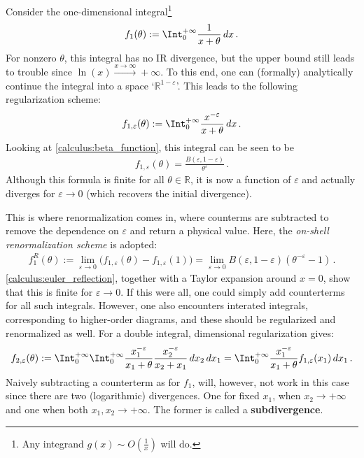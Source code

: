     Consider the one-dimensional integral\footnote{Any integrand $g(x)\sim O(\frac{1}{x})$ will do.}
    \begin{gather}
        f_1(\theta) := \Int_0^{+\infty}\frac{1}{x+\theta}\,dx\,.
    \end{gather}
    For nonzero $\theta$, this integral has no IR divergence, but the upper bound still leads to trouble since $\ln(x)\xrightarrow{x\longrightarrow\infty}+\infty$. To this end, one can (formally) analytically continue the integral into a space `$\mathbb{R}^{1-\varepsilon}$'. This leads to the following regularization scheme:
    \begin{gather}
        f_{1,\varepsilon}(\theta) := \Int_0^{+\infty}\frac{x^{-\varepsilon}}{x+\theta}\,dx\,.
    \end{gather}
    Looking at \cref{calculus:beta_function}, this integral can be seen to be
    \begin{gather}
        f_{1,\varepsilon}(\theta) = \frac{B(\varepsilon,1-\varepsilon)}{\theta^\varepsilon}\,.
    \end{gather}
    Although this formula is finite for all $\theta\in\mathbb{R}$, it is now a function of $\varepsilon$ and actually diverges for $\varepsilon\longrightarrow0$ (which recovers the initial divergence).

    This is where renormalization comes in, where counterms are subtracted to remove the dependence on $\varepsilon$ and return a physical value. Here, the \textit{on-shell renormalization scheme} is adopted:
    \begin{gather}
        f_1^R(\theta) := \lim_{\varepsilon\rightarrow0}\bigl(f_{1,\varepsilon}(\theta)-f_{1,\varepsilon}(1)\bigr) = \lim_{\varepsilon\rightarrow0}B(\varepsilon,1-\varepsilon)(\theta^{-\varepsilon}-1)\,.
    \end{gather}
    \cref{calculus:euler_reflection}, together with a Taylor expansion around $x=0$, show that this is finite for $\varepsilon\longrightarrow0$. If this were all, one could simply add counterterms for all such integrals. However, one also encounters interated integrals, corresponding to higher-order diagrams, and these should be regularized and renormalized as well. For a double integral, dimensional regularization gives:
    \begin{gather}
        f_{2,\varepsilon}(\theta) := \Int_0^{+\infty}\Int_0^{+\infty}\frac{x_1^{-\varepsilon}}{x_1+\theta}\frac{x_2^{-\varepsilon}}{x_2+x_1}\,dx_2\,dx_1 = \Int_0^{+\infty}\frac{x_1^{-\varepsilon}}{x_1+\theta}f_{1,\varepsilon}(x_1)\,dx_1\,.
    \end{gather}
    Naively subtracting a counterterm as for $f_1$, will, however, not work in this case since there are two (logarithmic) divergences. One for fixed $x_1$, when $x_2\longrightarrow+\infty$ and one when both $x_1,x_2\longrightarrow+\infty$. The former is called a \textbf{subdivergence}.

